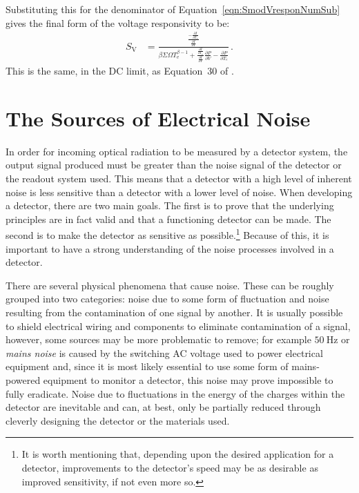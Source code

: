 Substituting this for the denominator of Equation~\ref{eqn:SmodVresponNumSub} gives the final form of the voltage responsivity to be:
\begin{align}
S_{\mathrm{V}} &=  \frac{\frac{-\frac{\partial I}{\partial T_{\mathrm{e}}}}
				{\frac{\partial I}{\partial V}}}
				{\beta \varSigma \varOmega T_{\mathrm{e}}^{\beta-1} 
				+ \frac{\frac{\partial I}{\partial T_{\mathrm{e}}}}
					{\frac{\partial I}{\partial V}}\frac{\partial P}{\partial V}
				- \frac{\partial P}{\partial T_{\mathrm{e}}}}\,. \label{res:Vresponsivity} 
\end{align}
This is the same, in the DC limit, as Equation~30 of \textcite{Golubev2001}.

\section{The Sources of Electrical Noise}
\label{sec:theory-noise}
In order for incoming optical radiation to be measured by a detector system, the output signal produced must be greater than the noise signal of the detector or the readout system used. This means that a detector with a high level of inherent noise is less sensitive than a detector with a lower level of noise. When developing a detector, there are two main goals. The first is to prove that the underlying principles are in fact valid and that a functioning detector can be made. The second is to make the detector as sensitive as possible.\footnote{It is worth mentioning that, depending upon the desired application for a detector, improvements to the detector's speed may be as desirable as improved sensitivity, if not even more so.} Because of this, it is important to have a strong understanding of the noise processes involved in a detector.
\par 
There are several physical phenomena that cause noise. These can be roughly grouped into two categories: noise due to some form of fluctuation and noise resulting from the contamination of one signal by another. It is usually possible to shield electrical wiring and components to eliminate contamination of a signal, however, some sources may be more problematic to remove; for example $50~\mathrm{Hz}$ or \textit{mains noise} is caused by the switching AC voltage used to power electrical equipment and, since it is most likely essential to use some form of mains-powered equipment to monitor a detector, this noise may prove impossible to fully eradicate. Noise due to fluctuations in the energy of the charges within the detector are inevitable and can, at best, only be partially reduced through cleverly designing the detector or the materials used.
